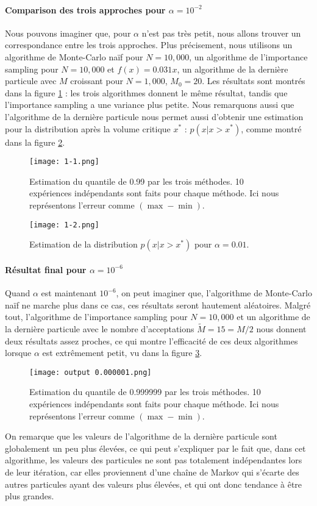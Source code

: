 \documentclass{article}
\begin{document}
\paragraph{Comparison des trois approches pour $\alpha=10^{-2}$} Nous pouvons imaginer que, pour $\alpha$ n'est pas très petit, nous allons trouver un correspondance entre les trois approches. Plus précisement, nous utilisons un algorithme de Monte-Carlo naïf pour $N=10,000$, un algorithme de l'importance sampling pour $N=10,000$ et $f(x)=0.031x$, un algorithme de la dernière particule avec $M$ croissant pour $N=1,000$, $M_0=20$. Les résultats sont montrés dans la figure \ref{0.1} : les trois algorithmes donnent le même résultat, tandis que l'importance sampling a une variance plus petite. Nous remarquons aussi que l'algorithme de la dernière particule nous permet aussi d'obtenir une estimation pour la distribution après la volume critique $x^\ast$ : $p(x|x>x^\ast)$, comme montré dans la figure \ref{0.2}.
\begin{figure}[H]
    \centering
    \texttt{[image: 1-1.png]}
    \caption{Estimation du quantile de 0.99 par les trois méthodes. 10 expériences indépendants sont faits pour chaque méthode. Ici nous représentons l'erreur comme $(\max - \min)$.}
    \label{0.1}
\end{figure}
\begin{figure}[H]
    \centering
    \texttt{[image: 1-2.png]}
    \caption{Estimation de la distribution $p(x|x>x^\ast)$ pour $\alpha=0.01$.}
    \label{0.2}
\end{figure}
\paragraph{Résultat final pour $\alpha=10^{-6}$} Quand $\alpha$ est maintenant $10^{-6}$, on peut imaginer que, l'algorithme de Monte-Carlo naïf ne marche plus dans ce cas, ces résultats seront hautement aléatoires. Malgré tout, l'algorithme de l'importance sampling pour $N=10,000$ et un algorithme de la dernière particule avec le nombre d'acceptations $\tilde M=15=M/2$ nous donnent deux résultats assez proches, ce qui montre l'efficacité de ces deux algorithmes lorsque $\alpha$ est extrêmement petit, vu dans la figure \ref{0.3}.
\begin{figure}[H]
    \centering
    \texttt{[image: output 0.000001.png]}
    \caption{Estimation du quantile de 0.999999 par les trois méthodes. 10 expériences indépendants sont faits pour chaque méthode. Ici nous représentons l'erreur comme $(\max - \min)$.}
    \label{0.3}
\end{figure}
On remarque que les valeurs de l'algorithme de la dernière particule sont globalement un peu plus élevées, ce qui peut s'expliquer par le fait que, dans cet algorithme, les valeurs des particules ne sont pas totalement indépendantes lors de leur itération, car elles proviennent d'une chaîne de Markov qui s'écarte des autres particules ayant des valeurs plus élevées, et qui ont donc tendance à être plus grandes.
\end{document}
